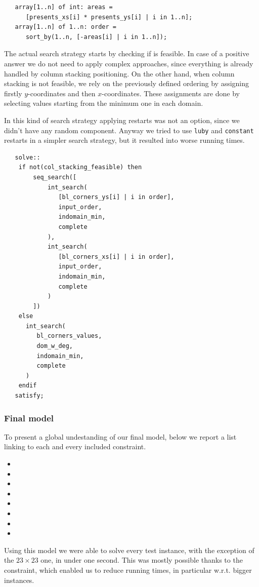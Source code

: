 \documentclass[a4paper,10pt]{article}
\begin{document}
\begin{verbatim}
   array[1..n] of int: areas =
      [presents_xs[i] * presents_ys[i] | i in 1..n];
   array[1..n] of 1..n: order =
      sort_by(1..n, [-areas[i] | i in 1..n]);
\end{verbatim}

The actual search strategy starts by checking if  is feasible. In case of a positive answer we do not need to apply complex approaches, since everything is already handled by column stacking positioning. On the other hand, when column stacking is not feasible, we rely on the previously defined ordering by assigning firstly $y$-coordinates and then $x$-coordinates. These assignments are done by selecting values starting from the minimum one in each domain.

In this kind of search strategy applying restarts was not an option, since we didn't have any random component. Anyway we tried to use \texttt{luby} and \texttt{constant} restarts in a simpler search strategy, but it resulted into worse running times.

\begin{verbatim}
   solve::
    if not(col_stacking_feasible) then
        seq_search([
            int_search(
               [bl_corners_ys[i] | i in order],
               input_order,
               indomain_min,
               complete
            ),
            int_search(
               [bl_corners_xs[i] | i in order],
               input_order,
               indomain_min,
               complete
            )
        ])
    else
      int_search(
         bl_corners_values,
         dom_w_deg,
         indomain_min,
         complete
      )
    endif
   satisfy;
\end{verbatim}

\subsubsection*{Final model}
To present a global undestanding of our final model, below we report a list linking to each and every included constraint.
\begin{itemize}
   \item {}
   \item {}
   \item {}
   \item {}
   \item {}
   \item {}
   \item {}
   \item {}
\end{itemize}
Using this model we were able to solve every test instance, with the exception of the $23\times23$ one, in under one second. This was mostly possible thanks to the  constraint, which enabled us to reduce running times, in particular w.r.t. bigger instances.
\end{document}
